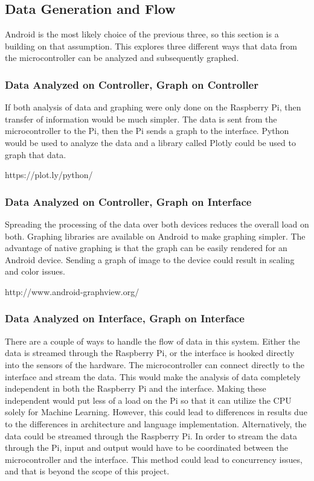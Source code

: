 \documentclass[draftclsnofoot,onecolumn,letterpaper,10pt]{IEEEtran}
\begin{document}
\subsection{Data Generation and Flow}
Android is the most likely choice of the previous three, so this section is a building on that assumption.
This explores three different ways that data from the microcontroller can be analyzed and subsequently graphed.

\subsubsection{Data Analyzed on Controller, Graph on Controller}
If both analysis of data and graphing were only done on the Raspberry Pi, then transfer of information would be much simpler.
The data is sent from the microcontroller to the Pi, then the Pi sends a graph to the interface.
Python would be used to analyze the data and a library called Plotly could be used to graph that data.


https://plot.ly/python/

\subsubsection{Data Analyzed on Controller, Graph on Interface}
Spreading the processing of the data over both devices reduces the overall load on both.
Graphing libraries are available on Android to make graphing simpler.
The advantage of native graphing is that the graph can be easily rendered for an Android device.
Sending a graph of image to the device could result in scaling and color issues.

http://www.android-graphview.org/

\subsubsection{Data Analyzed on Interface, Graph on Interface}
There are a couple of ways to handle the flow of data in this system.
Either the data is streamed through the Raspberry  Pi, or the interface is hooked directly into the sensors of the hardware.
The microcontroller can connect directly to the interface and stream the data.
This would make the analysis of data completely independent in both the Raspberry Pi and the interface.
Making these independent would put less of a load on the Pi so that it can utilize the CPU solely for Machine Learning.
However, this could lead to differences in results due to the differences in architecture and language implementation.
Alternatively, the data could be streamed through the Raspberry Pi.
In order to stream the data through the Pi, input and output would have to be coordinated between the microcontroller and the interface.
This method could lead to concurrency issues, and that is beyond the scope of this project.
\end{document}
